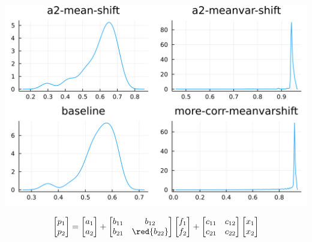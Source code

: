\documentclass[
  ignorenonframetext,
]{beamer}
\begin{document}
\begin{frame}{}
\protect\hypertarget{section-7}{}
\begin{center}\includegraphics[width=0.95\paperheight]{complexity_files/figure-beamer/unnamed-chunk-28-1} \end{center}

\[
\begin{bmatrix}
 p_1 \\ p_2
\end{bmatrix} =
\begin{bmatrix}
 a_1 \\ {a_2}
\end{bmatrix}
 + 
 \begin{bmatrix}
 {b_{11}} & b_{12} \\
 b_{21} & \red{b_{22}}
\end{bmatrix}
\begin{bmatrix}
 f_1 \\ f_2
\end{bmatrix}
+
 \begin{bmatrix}
 c_{11} & c_{12} \\
 c_{21} & c_{22}
\end{bmatrix}
\begin{bmatrix}
 x_1 \\ x_2
\end{bmatrix}
\]
\end{frame}
\end{document}

